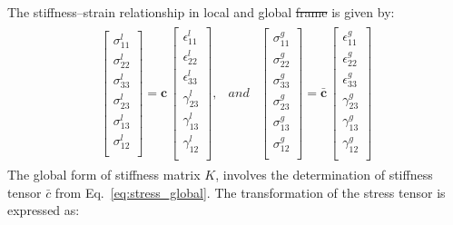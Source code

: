 \documentclass[materials,article,submit,moreauthors,pdftex]{Definitions/mdpi}
\providecommand{\DIFadd}[1]{{\protect\color{blue}{#1}}} %
\providecommand{\DIFdel}[1]{{\protect\color{red}\sout{#1}}}                      %
\providecommand{\DIFaddbegin}{} %
\providecommand{\DIFaddend}{} %
\providecommand{\DIFdelbegin}{} %
\providecommand{\DIFdelend}{} %
\begin{document}
The stiffness--strain relationship in local and global \DIFdelbegin \DIFdel{frame }\DIFdelend \DIFaddbegin \DIFadd{coordinate systems }\DIFaddend is given by:
\begin{eqnarray}
\begin{array}{ccc}
\left [
\begin{array}{c}
\sigma^l_{11}\\
\sigma^l_{22}\\ 
\sigma^l_{33}\\ 
\sigma^l_{23}\\
\sigma^l_{13}\\
\sigma^l_{12}\\
\end{array}
\right ]=
\textbf{c}\,\left [
\begin{array}{c}
\epsilon^l_{11}\\
\epsilon^l_{22}\\ 
\epsilon^l_{33}\\
\gamma^l_{23}\\
\gamma^l_{13}\\
\gamma^l_{12}\\
\end{array}
\right ], & and &
\left [
\begin{array}{c}
\sigma^g_{11}\\
\sigma^g_{22}\\ 
\sigma^g_{33}\\ 
\sigma^g_{23}\\
\sigma^g_{13}\\
\sigma^g_{12}\\
\end{array}
\right ]=
\bar{\textbf{c}}\,\left [
\begin{array}{c}
\epsilon^g_{11}\\
\epsilon^g_{22}\\ 
\epsilon^g_{33}\\
\gamma^g_{23}\\
\gamma^g_{13}\\
\gamma^g_{12}\\
\end{array}
\right ]
\end{array}
\label{eq:stress_global}
\end{eqnarray}
The global form of stiffness matrix \(K\), involves the determination of stiffness tensor \(\bar{c}\) from Eq.~\ref{eq:stress_global}.
The transformation of the stress tensor is expressed as:
\end{document}
